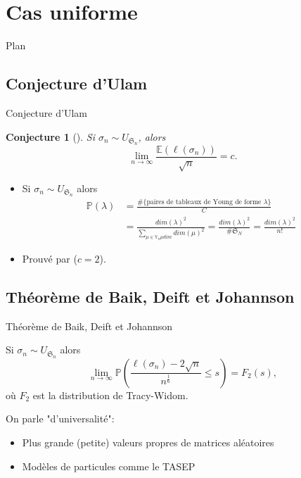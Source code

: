 \documentclass[french]{beamer}
\newtheorem{conjecture}[theorem]{Conjecture}
\begin{document}
\section{Cas uniforme}
\begin{frame}{Plan}
\tableofcontents[currentsection,currentsubsection,
    hideothersubsections, 
    sectionstyle=show/shaded,
]
\end{frame}
\subsection{Conjecture d'Ulam}
\begin{frame}{Conjecture d'Ulam}
    \begin{conjecture}[\cite{ulam}]
    Si $\sigma_n \sim {U}_{\mathfrak{S}_n}$, alors
    $$\lim_{n\to \infty}\frac{\mathbb{E}(\ell(\sigma_n))}{\sqrt{n}}=c.$$ 
    \end{conjecture}
\begin{itemize}
    \item Si $\sigma_n \sim {U}_{\mathfrak{S}_n}$ alors 
    \begin{align*}
    \mathbb{P}(\lambda)&=\frac{\#\{\text{paires de tableaux de Young de forme } \lambda\}}{C}\\&=\frac{dim(\lambda)^2}{\sum_{\mu\in \mathbb{Y}_nμdim} dim( \mu)^2}=\frac{dim(\lambda)^2}{\# \mathfrak{S}_N}=\frac{dim(\lambda)^2}{n!} 
    \end{align*}
    \item Prouvé par \cite{vershik} ($c=2$).
\end{itemize}


\end{frame}

\subsection{Théorème de Baik, Deift et Johannson}
\begin{frame}{Théorème de Baik, Deift et Johannson}
    \begin{theorem} 
Si $\sigma_n \sim U_{\mathfrak{S}_n}$ alors
\begin{equation*} 
\lim_{n \to \infty} \mathbb{P}\left(\frac{\ell(\sigma_n)-2\sqrt{n}}{n^\frac 16}\leq s\right)=F_2(s),
\end{equation*}
o\`u  $F_2$ est la distribution de Tracy-Widom.
\end{theorem}
On parle "d'universalité":
\begin{itemize}
    \item Plus grande (petite) valeurs propres de matrices aléatoires
    \item Modèles de particules comme le TASEP
\end{itemize}
\end{frame}
\end{document}
